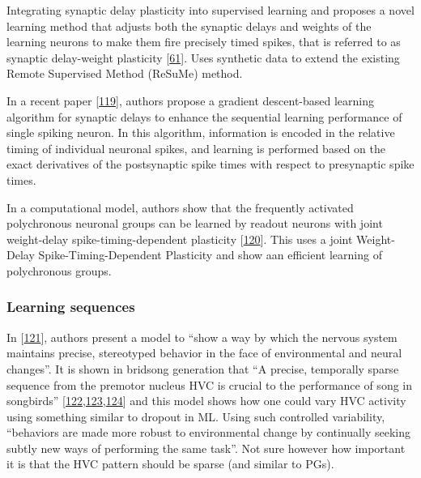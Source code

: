 Integrating synaptic delay plasticity into supervised learning and proposes a novel learning method that adjusts both the synaptic delays and weights of the learning neurons to make them fire precisely timed spikes, that is referred to as synaptic delay-weight plasticity {[}\protect\hyperlink{ref-ga3ZTFC7}{61}{]}. Uses synthetic data to extend the existing Remote Supervised Method (ReSuMe) method.

In a recent paper {[}\protect\hyperlink{ref-B493Fl4K}{119}{]}, authors propose a gradient descent-based learning algorithm for synaptic delays to enhance the sequential learning performance of single spiking neuron. In this algorithm, information is encoded in the relative timing of individual neuronal spikes, and learning is performed based on the exact derivatives of the postsynaptic spike times with respect to presynaptic spike times.

In a computational model, authors show that the frequently activated polychronous neuronal groups can be learned by readout neurons with joint weight-delay spike-timing-dependent plasticity {[}\protect\hyperlink{ref-pPRQwZb}{120}{]}. This uses a joint Weight-Delay Spike-Timing-Dependent Plasticity and show aan efficient learning of polychronous groups.

\hypertarget{learning-sequences}{%
\subsubsection{Learning sequences}\label{learning-sequences}}

In {[}\protect\hyperlink{ref-WFwUKZb5}{121}{]}, authors present a model to ``show a way by which the nervous system maintains precise, stereotyped behavior in the face of environmental and neural changes''. It is shown in bridsong generation that ``A precise, temporally sparse sequence from the premotor nucleus HVC is crucial to the performance of song in songbirds'' {[}\protect\hyperlink{ref-1EhOfHrje}{122},\protect\hyperlink{ref-Dry1ANMD}{123},\protect\hyperlink{ref-SAIh1pga}{124}{]} and this model shows how one could vary HVC activity using something similar to dropout in ML. Using such controlled variability, ``behaviors are made more robust to environmental change by continually seeking subtly new ways of performing the same task''. Not sure however how important it is that the HVC pattern should be sparse (and similar to PGs).

